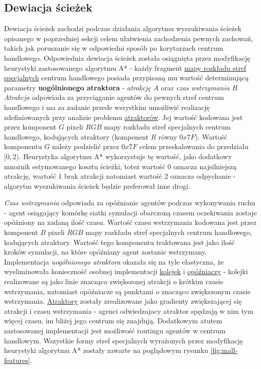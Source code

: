 \documentclass[a4paper, 12pt]{article}
\begin{document}
        \subsection{Dewiacja ścieżek}
        \label{sec:path-deviation}

        Dewiacja ścieżek zachodzi podczas działania algorytmu wyszukiwania ścieżek opisanego w poprzedniej sekcji celem ułatwienia zachodzenia pewnych zachowań, takich jak poruszanie się w odpowiedni sposób po korytarzach centrum handlowego. Odpowiednia dewiacja ścieżek została osiągnięta przez modyfikację heurystyki zastosowanego algorytmu A* - każdy fragment \hyperref[fig:mall-features]{mapy rozkładu stref specjalnych} centrum handlowego posiada przypisaną mu wartość determinującą parametry \textbf{uogólnionego atraktora} - \emph{atrakcję A} oraz \emph{czas wstrzymania H}. \\

        \emph{Atrakcja} odpowiada za przyciąganie agentów do pewnych stref centrum handlowego i ma za zadanie przede wszystkim umożliwić realizację zdefiniowanych przy analizie problemu \hyperref[sec:attractors]{atraktorów}. Jej wartość kodowana jest przez komponent $G$ pixeli $RGB$ mapy rozkładu stref specjalnych centrum handlowego, kodujących atraktory (komponent $R$ równy $0x7F$). Wartość komponentu $G$ należy podzielić przez $0x7F$ celem przeskalowania do przedziału $[0, 2)$. Heurystyka algorytmu A* wykorzystuje tę wartość, jako dodatkowy mnożnik estymowanego kosztu ścieżki, toteż wartość 0 oznacza najsilniejszą atrakcję, wartość 1 brak atrakcji natomiast wartość 2 oznacza odpychanie - algorytm wyszukiwania ścieżek będzie preferował inne drogi.

        \emph{Czas wstrzymania} odpowiada za opóźnianie agentów podczas wykonywania ruchu - agent osiągający komórkę siatki symulacji obarczoną czasem oczekiwania zostaje opóźniony na zadaną ilość czasu. Wartość czasu wstrzymania kodowana jest przez komponent $B$ pixeli $RGB$ mapy rozkładu stref specjalnych centrum handlowego, kodujących atraktory. Wartość tego komponentu traktowana jest jako ilość kroków symulacji, na które opóźniany agent zostanie wstrzymany. \\

Implementacja \emph{uogólnionego atraktora} okazała się na tyle elastyczna, że wyeliminowała konieczność osobnej implementacji \hyperref[sec:queues]{kolejek} i \hyperref[sec:holders]{opóźniaczy} - kolejki realizowane są jako linie znacząco zwiększonej atrakcji o krótkim czasie wstrzymania, natomiast opóźniacze są punktami o znacząco zwiększonym czasie wstrzymania. \hyperref[sec:atractors]{Atraktory} zostały zrealizowane jako gradienty zwiększającej się atrakcji i czasu wstrzymania - agenci odwiedzajacy atraktor spędzają w nim tym więcej czasu, im bliżej jego centrum się znajdują. Dodatkowym atutem zastosowanej implementacji jest możliwość routingu agentów w centrum handlowym. Wszystkie formy stref specjalnych wyrażonych przez modyfikację heurystyki algorytmu A* zostały zawarte na poglądowym rysunku \ref{fig:mall-features}.
\end{document}
